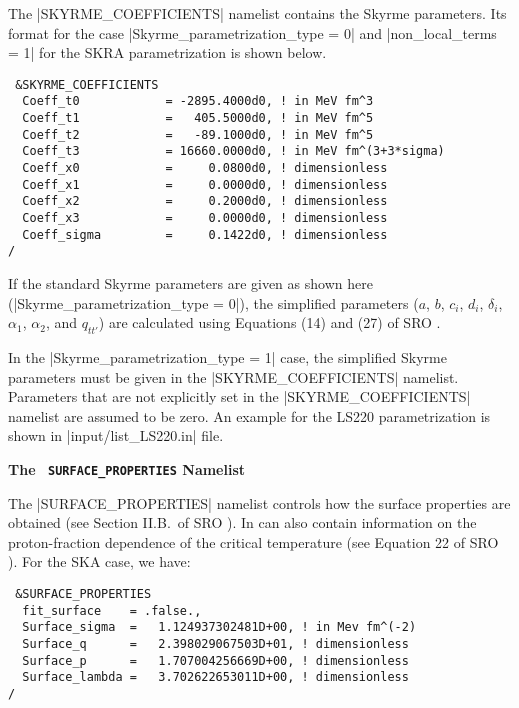 \documentclass[letterpaper,11pt]{refart}
\begin{document}
The \verbnml|SKYRME_COEFFICIENTS| namelist contains the Skyrme
parameters.  Its format for the case
\verbprm|Skyrme_parametrization_type = 0| and
\verbprm|non_local_terms = 1| for the SKRA parametrization is shown
below.

{\color{cyan}
\begin{verbatim}
 &SKYRME_COEFFICIENTS
  Coeff_t0            = -2895.4000d0, ! in MeV fm^3
  Coeff_t1            =   405.5000d0, ! in MeV fm^5
  Coeff_t2            =   -89.1000d0, ! in MeV fm^5
  Coeff_t3            = 16660.0000d0, ! in MeV fm^(3+3*sigma)
  Coeff_x0            =     0.0800d0, ! dimensionless
  Coeff_x1            =     0.0000d0, ! dimensionless
  Coeff_x2            =     0.2000d0, ! dimensionless
  Coeff_x3            =     0.0000d0, ! dimensionless
  Coeff_sigma         =     0.1422d0, ! dimensionless
/
\end{verbatim}}

If the standard Skyrme parameters are given as shown here
(\verbprm|Skyrme_parametrization_type = 0|), the simplified parameters
($a$, $b$, $c_i$, $d_i$, $\delta_i$, $\alpha_1$, $\alpha_2$, and
$q_{tt'}$) are calculated using Equations (14) and (27) of SRO
\cite{schneider:17}.


In the \verbprm|Skyrme_parametrization_type = 1| case, the simplified
Skyrme parameters must be given in the \verbnml|SKYRME_COEFFICIENTS|
namelist. Parameters that are not explicitly set in the
\verbnml|SKYRME_COEFFICIENTS| namelist are assumed to be zero. An
example for the LS220 parametrization is shown in
\verbfile|input/list_LS220.in| file.




\bigskip
\textbf{The \texttt{\color{cyan} SURFACE\_PROPERTIES} Namelist}

The \verbnml|SURFACE_PROPERTIES| namelist controls how the surface
properties are obtained (see Section II.B.\ of SRO
\cite{schneider:17}). In can also contain information on the
proton-fraction dependence of the critical temperature (see Equation
22 of SRO \cite{schneider:17}).  For the SKA case, we have:


{\color{cyan}
\begin{verbatim}
 &SURFACE_PROPERTIES
  fit_surface    = .false.,
  Surface_sigma  =   1.124937302481D+00, ! in Mev fm^(-2)
  Surface_q      =   2.398029067503D+01, ! dimensionless
  Surface_p      =   1.707004256669D+00, ! dimensionless
  Surface_lambda =   3.702622653011D+00, ! dimensionless
/
\end{verbatim}}
\end{document}
